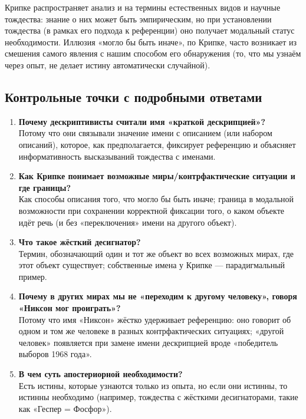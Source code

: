 \documentclass[a4paper,12pt]{article}
\begin{document}
Крипке распространяет анализ и на термины естественных видов и научные тождества: знание о них может быть эмпирическим, но при установлении тождества (в рамках его подхода к референции) оно получает модальный статус необходимости. Иллюзия «могло бы быть иначе», по Крипке, часто возникает из смешения самого явления с нашим способом его обнаружения (то, что мы узнаём через опыт, не делает истину автоматически случайной).

\subsection{Контрольные точки с подробными ответами}

\begin{enumerate}
    \item \textbf{Почему дескриптивисты считали имя «краткой дескрипцией»?}\\
    Потому что они связывали значение имени с описанием (или набором описаний), которое, как предполагается, фиксирует референцию и объясняет информативность высказываний тождества с именами.
    \item \textbf{Как Крипке понимает возможные миры/контрфактические ситуации и где границы?}\\
    Как способы описания того, что могло бы быть иначе; граница в модальной возможности при сохранении корректной фиксации того, о каком объекте идёт речь (и без «переключения» имени на другого объект).
    \item \textbf{Что такое жёсткий десигнатор?}\\
    Термин, обозначающий один и тот же объект во всех возможных мирах, где этот объект существует; собственные имена у Крипке — парадигмальный пример.
    \item \textbf{Почему в других мирах мы не «переходим к другому человеку», говоря «Никсон мог проиграть»?}\\
    Потому что имя «Никсон» жёстко удерживает референцию: оно говорит об одном и том же человеке в разных контрфактических ситуациях; «другой человек» появляется при замене имени дескрипцией вроде «победитель выборов 1968 года».
    \item \textbf{В чем суть апостериорной необходимости?}\\
    Есть истины, которые узнаются только из опыта, но если они истинны, то истинны необходимо (например, тождества с жёсткими десигнаторами, такие как «Геспер = Фосфор»).
\end{enumerate}
\end{document}
